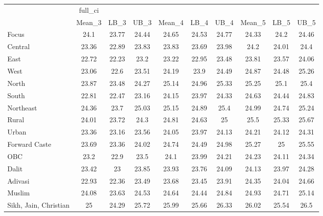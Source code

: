 \begin{tabular}{l*{9}{c}}
\hline\hline
                    &     full\_ci&            &            &            &            &            &            &            &            \\
                    &      Mean\_3&        LB\_3&        UB\_3&      Mean\_4&        LB\_4&        UB\_4&      Mean\_5&        LB\_5&        UB\_5\\
\midrule
Focus               &        24.1&       23.77&       24.44&       24.65&       24.53&       24.77&       24.33&        24.2&       24.46\\
Central             &       23.36&       22.89&       23.83&       23.83&       23.69&       23.98&        24.2&       24.01&        24.4\\
East                &       22.72&       22.23&        23.2&       23.22&       22.95&       23.48&       23.81&       23.57&       24.06\\
West                &       23.06&        22.6&       23.51&       24.19&        23.9&       24.49&       24.87&       24.48&       25.26\\
North               &       23.87&       23.48&       24.27&       25.14&       24.96&       25.33&       25.25&        25.1&        25.4\\
South               &       22.81&       22.47&       23.16&       24.15&       23.97&       24.33&       24.63&       24.44&       24.83\\
Northeast           &       24.36&        23.7&       25.03&       25.15&       24.89&        25.4&       24.99&       24.74&       25.24\\
Rural               &       24.01&       23.72&        24.3&       24.81&       24.63&          25&        25.5&       25.33&       25.67\\
Urban               &       23.36&       23.16&       23.56&       24.05&       23.97&       24.13&       24.21&       24.12&       24.31\\
Forward Caste       &       23.69&       23.36&       24.02&       24.74&       24.49&       24.98&       25.27&          25&       25.55\\
OBC                 &        23.2&        22.9&        23.5&        24.1&       23.99&       24.21&       24.23&       24.11&       24.34\\
Dalit               &       23.42&          23&       23.85&       23.93&       23.76&       24.09&       24.13&       23.97&       24.28\\
Adivasi             &       22.93&       22.36&       23.49&       23.68&       23.45&       23.91&       24.35&       24.04&       24.66\\
Muslim              &       24.08&       23.63&       24.53&       24.64&       24.44&       24.84&       24.93&       24.71&       25.14\\
Sikh, Jain, Christian&          25&       24.29&       25.72&       25.99&       25.66&       26.33&       26.02&       25.54&        26.5\\
\hline\hline
\end{tabular}